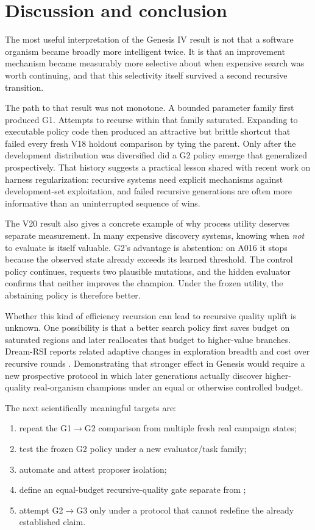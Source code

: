 \section{Discussion and conclusion}

The most useful interpretation of the Genesis IV result is not that a software organism became broadly more intelligent twice. It is that an improvement mechanism became measurably more selective about when expensive search was worth continuing, and that this selectivity itself survived a second recursive transition.

The path to that result was not monotone. A bounded parameter family first produced G1. Attempts to recurse within that family saturated. Expanding to executable policy code then produced an attractive but brittle shortcut that failed every fresh V18 holdout comparison by tying the parent. Only after the development distribution was diversified did a G2 policy emerge that generalized prospectively. That history suggests a practical lesson shared with recent work on harness regularization: recursive systems need explicit mechanisms against development-set exploitation, and failed recursive generations are often more informative than an uninterrupted sequence of wins.

The V20 result also gives a concrete example of why process utility deserves separate measurement. In many expensive discovery systems, knowing when \emph{not} to evaluate is itself valuable. G2's advantage is abstention: on A016 it stops because the observed state already exceeds its learned threshold. The control policy continues, requests two plausible mutations, and the hidden evaluator confirms that neither improves the champion. Under the frozen utility, the abstaining policy is therefore better.

Whether this kind of efficiency recursion can lead to recursive quality uplift is unknown. One possibility is that a better search policy first saves budget on saturated regions and later reallocates that budget to higher-value branches. Dream-RSI reports related adaptive changes in exploration breadth and cost over recursive rounds \cite{zheng2026dreamrsi}. Demonstrating that stronger effect in Genesis would require a new prospective protocol in which later generations actually discover higher-quality real-organism champions under an equal or otherwise controlled budget.

The next scientifically meaningful targets are:
\begin{enumerate}
  \item repeat the G1$\rightarrow$G2 comparison from multiple fresh real campaign states;
  \item test the frozen G2 policy under a new evaluator/task family;
  \item automate and attest proposer isolation;
  \item define an equal-budget recursive-quality gate separate from \lthreep;
  \item attempt G2$\rightarrow$G3 only under a protocol that cannot redefine the already established claim.
\end{enumerate}

